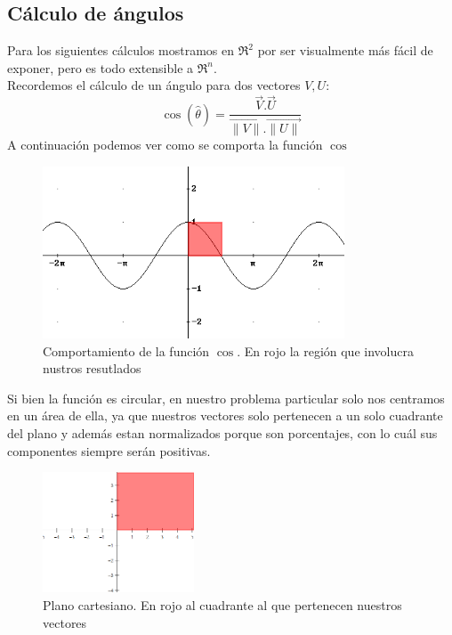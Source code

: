 \subsection{Cálculo de ángulos}
Para los siguientes cálculos mostramos en $\Re^{2}$ por ser visualmente más fácil de exponer, pero es todo extensible a $\Re^{n}$.\\
Recordemos el cálculo de un ángulo para dos vectores $V, U$:\\
$$\cos(\hat{\theta}) = \dfrac{\overrightarrow{V}.\overrightarrow{U}}{\overrightarrow{\lVert V\lVert}.\overrightarrow{\lVert U\lVert}}$$
A continuación podemos ver como se comporta la función $\cos$\\
\begin{figure}[H]
  \centering
    \includegraphics[width=0.8\textwidth]{img/coseno.png}
  \caption{Comportamiento de la función $\cos$. En rojo la región que involucra nustros resutlados}
  \label{bus:img-coseno}
\end{figure}
Si bien la función es circular, en nuestro problema particular solo nos centramos en un área de ella, ya que nuestros vectores solo pertenecen a un solo cuadrante del plano y además estan normalizados porque son porcentajes, con lo cuál sus componentes siempre serán positivas.\\
\begin{figure}[H]
  \centering
    \includegraphics[width=0.4\textwidth]{img/planoCartesiano.png}
  \caption{Plano cartesiano. En rojo al cuadrante al que pertenecen nuestros vectores}
  \label{bus:img-planoCartesiano}
\end{figure}
